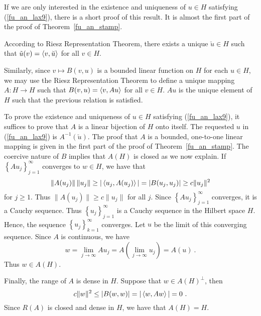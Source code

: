 \begin{rmk}
If we are only interested in the existence and uniqueness of $u\in H$
satisfying (\ref{fu_an_lax9}), there is a short proof of this result.
It is almost the first part of the proof of Theorem~\ref{fu_an_stamp}.
\label{fu_an_LaxMilgTh1}

According to Riesz Representation Theorem, there
exists a unique $\breve{u} \in H$ such that
$\displaystyle \tilde{u}(v) = \left\langle{v} , {\breve{u}}\right\rangle$ for all $v \in H$.

Similarly, since $v \mapsto B(v,u)$ is a bounded linear function on
$H$ for each $u\in H$, we may use the Riesz Representation Theorem
to define a unique mapping $A:H \rightarrow H$ such that
$\displaystyle B(v,u) = \left\langle{v} , {Au}\right\rangle$ for all $v \in H$.
$Au$ is the unique element of $H$ such that the previous relation is
satisfied.

To prove the existence and uniqueness of $u\in H$ satisfying
(\ref{fu_an_lax9}), it suffices to prove that $A$ is a linear bijection of
$H$ onto itself.  The requested $u$ in (\ref{fu_an_lax9}) is
$\displaystyle A^{-1}(\breve{u})$.  The proof that $A$ is a bounded, one-to-one
linear mapping is given in the first part of the proof of
Theorem~\ref{fu_an_stamp}.  The coercive nature of $B$ implies that
$A(H)$ is closed as we now explain.  If
$\displaystyle \left\{A u_j\right\}_{j=1}^\infty$ converges to
$w\in H$, we have that
\[
\|A(u_j)\|\,\|u_j\| \geq |\left\langle{u_j} , {A(u_j)}\right\rangle| = |B(u_j,u_j)| \geq c
\|u_j\|^2
\]
for $j \geq 1$.
Thus $\displaystyle \|A(u_j)\| \geq c \|u_j\|$ for all $j$.  Since 
$\displaystyle \left\{A u_j\right\}_{j=1}^\infty$ converges, it is a
Cauchy sequence.  Thus
$\displaystyle \left\{u_j\right\}_{j=1}^\infty$ is a Cauchy sequence 
in the Hilbert space $H$.  Hence, the sequence
$\displaystyle \left\{u_j\right\}_{k=1}^\infty$ converges.  Let $u$ be the
limit of this converging sequence.  Since $A$ is continuous, we have
\[
w = \lim_{j\rightarrow \infty} A u_{j}
= A\left( \lim_{j\rightarrow \infty} u_j\right) = A(u) \  .
\]
Thus $w \in A(H)$.

Finally, the range of $A$ is dense in $H$.  Suppose that
$\displaystyle w \in A(H)^\perp$,
then
\[
c \|w\|^2 \leq |B(w,w)| = |\left\langle{w} , {Aw}\right\rangle| = 0 \  .
\]
Since $R(A)$ is closed and dense in $H$, we have that $A(H)=H$.
\end{rmk}

